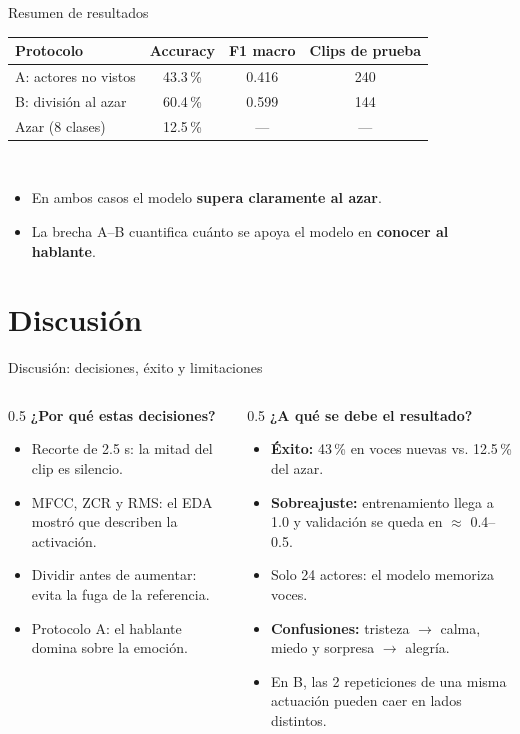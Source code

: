 \documentclass[aspectratio=169,11pt]{beamer}
\newcommand{\accB}{60.4}   %
\newcommand{\ftB}{0.599}   %
\begin{document}
\begin{frame}{Resumen de resultados}
  \centering
  \begin{tabular}{lccc}
    \toprule
    Protocolo & Accuracy & F1 macro & Clips de prueba \\
    \midrule
    A: actores no vistos & 43.3\,\% & 0.416 & 240 \\
    B: división al azar & \accB\,\% & \ftB & 144 \\
    Azar (8 clases) & 12.5\,\% & --- & --- \\
    \bottomrule
  \end{tabular}\\[1em]
  \begin{itemize}
    \item En ambos casos el modelo \textbf{supera claramente al azar}.
    \item La brecha A--B cuantifica cuánto se apoya el modelo en \textbf{conocer al hablante}.
  \end{itemize}
\end{frame}

\section{Discusión}
\begin{frame}{Discusión: decisiones, éxito y limitaciones}
  \begin{columns}[T]
    \begin{column}{0.5\textwidth}
      \textbf{¿Por qué estas decisiones?}
      \begin{itemize}
        \item Recorte de 2.5 s: la mitad del clip es silencio.
        \item MFCC, ZCR y RMS: el EDA mostró que describen la activación.
        \item Dividir antes de aumentar: evita la fuga de la referencia.
        \item Protocolo A: el hablante domina sobre la emoción.
      \end{itemize}
    \end{column}
    \begin{column}{0.5\textwidth}
      \textbf{¿A qué se debe el resultado?}
      \begin{itemize}
        \item \textbf{Éxito:} 43\,\% en voces nuevas vs. 12.5\,\% del azar.
        \item \textbf{Sobreajuste:} entrenamiento llega a 1.0 y validación se queda en $\approx$ 0.4--0.5.
        \item Solo 24 actores: el modelo memoriza voces.
        \item \textbf{Confusiones:} tristeza $\to$ calma, miedo y sorpresa $\to$ alegría.
        \item En B, las 2 repeticiones de una misma actuación pueden caer en lados distintos.
      \end{itemize}
    \end{column}
  \end{columns}
\end{frame}
\end{document}

